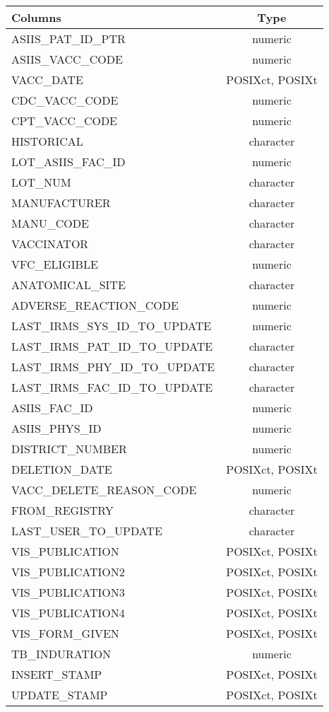 \documentclass[
  letterpaper,
  DIV=11,
  numbers=noendperiod]{scrreprt}
\begin{document}
\begin{longtable}{lc}
\toprule
Columns & Type \\ 
\midrule
ASIIS\_PAT\_ID\_PTR & numeric \\ 
ASIIS\_VACC\_CODE & numeric \\ 
VACC\_DATE & POSIXct, POSIXt \\ 
CDC\_VACC\_CODE & numeric \\ 
CPT\_VACC\_CODE & numeric \\ 
HISTORICAL & character \\ 
LOT\_ASIIS\_FAC\_ID & numeric \\ 
LOT\_NUM & character \\ 
MANUFACTURER & character \\ 
MANU\_CODE & character \\ 
VACCINATOR & character \\ 
VFC\_ELIGIBLE & numeric \\ 
ANATOMICAL\_SITE & character \\ 
ADVERSE\_REACTION\_CODE & numeric \\ 
LAST\_IRMS\_SYS\_ID\_TO\_UPDATE & numeric \\ 
LAST\_IRMS\_PAT\_ID\_TO\_UPDATE & character \\ 
LAST\_IRMS\_PHY\_ID\_TO\_UPDATE & character \\ 
LAST\_IRMS\_FAC\_ID\_TO\_UPDATE & character \\ 
ASIIS\_FAC\_ID & numeric \\ 
ASIIS\_PHYS\_ID & numeric \\ 
DISTRICT\_NUMBER & numeric \\ 
DELETION\_DATE & POSIXct, POSIXt \\ 
VACC\_DELETE\_REASON\_CODE & numeric \\ 
FROM\_REGISTRY & character \\ 
LAST\_USER\_TO\_UPDATE & character \\ 
VIS\_PUBLICATION & POSIXct, POSIXt \\ 
VIS\_PUBLICATION2 & POSIXct, POSIXt \\ 
VIS\_PUBLICATION3 & POSIXct, POSIXt \\ 
VIS\_PUBLICATION4 & POSIXct, POSIXt \\ 
VIS\_FORM\_GIVEN & POSIXct, POSIXt \\ 
TB\_INDURATION & numeric \\ 
INSERT\_STAMP & POSIXct, POSIXt \\ 
UPDATE\_STAMP & POSIXct, POSIXt \\ 

\end{longtable}
\end{document}
